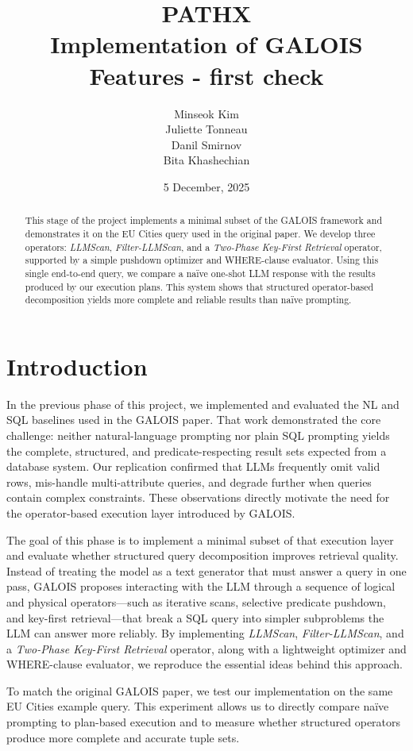 \documentclass[12pt]{article}
\title{PATHX \\ \large Implementation of GALOIS Features - first check}
\author{
    Minseok Kim \\
    Juliette Tonneau\\
    Danil Smirnov \\
    Bita Khashechian \\
}
\date{5 December, 2025}
\begin{document}
\maketitle
\tableofcontents


\begin{abstract}
This stage of the project implements a minimal subset of the GALOIS framework and demonstrates it on the EU Cities query used in the original paper. We develop three operators: \textit{LLMScan}, \textit{Filter-LLMScan}, and a \textit{Two-Phase Key-First Retrieval} operator, supported by a simple pushdown optimizer and WHERE-clause evaluator. Using this single end-to-end query, we compare a naïve one-shot LLM response with the results produced by our execution plans. This system shows that structured operator-based decomposition yields more complete and reliable results than naïve prompting.
\end{abstract}


\section{Introduction}
 In the previous phase of this project, we implemented and evaluated the NL and SQL baselines used in the GALOIS paper. That work demonstrated the core challenge: neither natural-language prompting nor plain SQL prompting yields the complete, structured, and predicate-respecting result sets expected from a database system. Our replication confirmed that LLMs frequently omit valid rows, mis-handle multi-attribute queries, and degrade further when queries contain complex constraints. These observations directly motivate the need for the operator-based execution layer introduced by GALOIS. 

The goal of this phase is to implement a minimal subset of that execution layer and evaluate whether structured query decomposition improves retrieval quality. Instead of treating the model as a text generator that must answer a query in one pass, GALOIS proposes interacting with the LLM through a sequence of logical and physical operators—such as iterative scans, selective predicate pushdown, and key-first retrieval—that break a SQL query into simpler subproblems the LLM can answer more reliably. By implementing \textit{LLMScan}, \textit{Filter-LLMScan}, and a \textit{Two-Phase Key-First Retrieval} operator, along with a lightweight optimizer and WHERE-clause evaluator, we reproduce the essential ideas behind this approach. 

To match the original GALOIS paper, we test our implementation on the same EU Cities example query. This experiment allows us to directly compare naïve prompting to plan-based execution and to measure whether structured operators produce more complete and accurate tuple sets.
\end{document}
